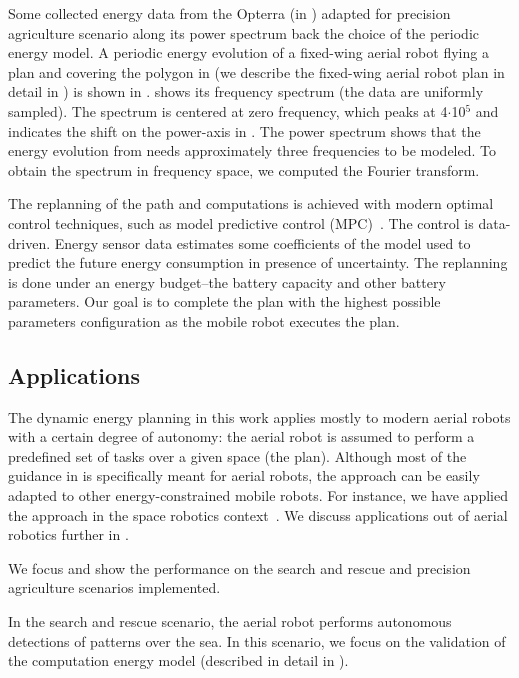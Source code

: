 Some collected energy data from the Opterra (in ) adapted for precision agriculture scenario along its power spectrum back the choice of the periodic energy model. A periodic energy evolution of a fixed-wing aerial robot flying a plan and covering the polygon in  (we describe the fixed-wing aerial robot plan in detail in ) is shown in .  shows its frequency spectrum (the data are uniformly sampled). The spectrum is centered at zero frequency, which peaks at 4$\cdot$10${}^{\text{5}}$ and indicates the shift on the power-axis in . The power spectrum shows that the energy evolution from  needs approximately three frequencies to be modeled. To obtain the spectrum in frequency space, we computed the Fourier transform.

The replanning of the path and computations is achieved with modern optimal control techniques, such as model predictive control (MPC)~\citep{rawlings2017model}. The control is data-driven. Energy sensor data estimates some coefficients of the model used to predict the future energy consumption in presence of uncertainty. The replanning is done under an energy budget--the battery capacity and other battery parameters. Our goal is to complete the plan with the highest possible parameters configuration as the mobile robot executes the plan. 

\subsection{Applications}

The dynamic energy planning in this work applies mostly to modern aerial robots with a certain degree of autonomy: the aerial robot is assumed to perform a predefined set of tasks over a given space (the plan). Although most of the guidance in  is specifically meant for aerial robots, the approach can be easily adapted to other energy-constrained mobile robots. For instance, we have applied the approach in the space robotics context~\citep{seewald2020beyond}. We discuss applications out of aerial robotics further in .

We focus and show the performance on the search and rescue and precision agriculture scenarios implemented. 

In the search and rescue scenario, the aerial robot performs autonomous detections of patterns over the sea. In this scenario, we focus on the validation of the computation energy model (described in detail in ).

